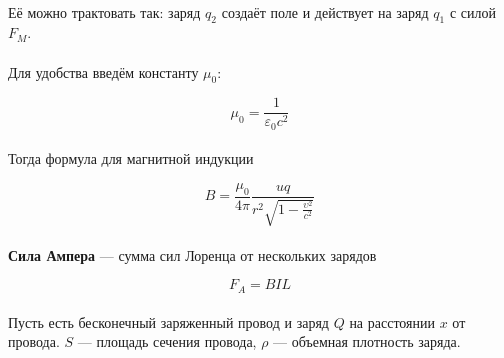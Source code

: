 \documentclass[dvipdfmx]{article}
\begin{document}
\paragraph{}

Её можно трактовать так: заряд $q_2$ создаёт поле и действует на заряд $q_1$ с силой $F_M$.

\paragraph{}

Для удобства введём константу $\mu_0$:

\begin{equation*}
  \mu_0 = \frac{1}{\varepsilon_0c^2}
\end{equation*}
\paragraph{}

Тогда формула для магнитной индукции

\begin{equation*}
  B = \frac{\mu_0}{4\pi}\frac{uq}{r^2\sqrt{1-\frac{\upsilon^2}{c^2}}}
\end{equation*}
\paragraph{}

\textbf{Сила Ампера} --- сумма сил Лоренца от нескольких зарядов

\begin{equation*}
  F_A = BIL
\end{equation*}

\newpage

\paragraph{}
Пусть есть бесконечный заряженный провод и заряд $Q$ на расстоянии $x$ от провода. $S$ --- площадь
сечения провода, $\rho$ --- объемная плотность заряда.
\end{document}
